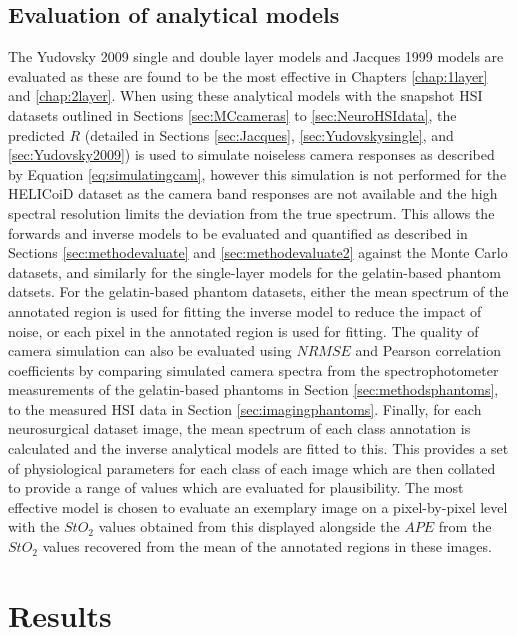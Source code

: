 \subsection{Evaluation of analytical models}
The Yudovsky 2009 single and double layer models and Jacques 1999 models are evaluated as these are found to be the most effective in Chapters \ref{chap:1layer} and \ref{chap:2layer}. When using these analytical models with the snapshot HSI datasets outlined in Sections \ref{sec:MCcameras} to \ref{sec:NeuroHSIdata}, the predicted $R$ (detailed in Sections \ref{sec:Jacques}, \ref{sec:Yudovskysingle}, and \ref{sec:Yudovsky2009}) is used to simulate noiseless camera responses as described by Equation \ref{eq:simulatingcam}, however this simulation is not performed for the HELICoiD dataset as the camera band responses are not available and the high spectral resolution limits the deviation from the true spectrum. This allows the forwards and inverse models to be evaluated and quantified as described in Sections \ref{sec:methodevaluate} and \ref{sec:methodevaluate2} against the Monte Carlo datasets, and similarly for the single-layer models for the gelatin-based phantom datsets. For the gelatin-based phantom datasets, either the mean spectrum of the annotated region is used for fitting the inverse model to reduce the impact of noise, or each pixel in the annotated region is used for fitting. The quality of camera simulation can also be evaluated using $NRMSE$ and Pearson correlation coefficients by comparing simulated camera spectra from the spectrophotometer measurements of the gelatin-based phantoms in Section \ref{sec:methodsphantoms}, to the measured HSI data in Section \ref{sec:imagingphantoms}. Finally, for each neurosurgical dataset image, the mean spectrum of each class annotation is calculated and the inverse analytical models are fitted to this. This provides a set of physiological parameters for each class of each image which are then collated to provide a range of values which are evaluated for plausibility. %
The most effective model is chosen to evaluate an exemplary image on a pixel-by-pixel level with the $StO_2$ values obtained from this displayed alongside the $APE$ from the $StO_2$ values recovered from the mean of the annotated regions in these images. 

\section{Results}

